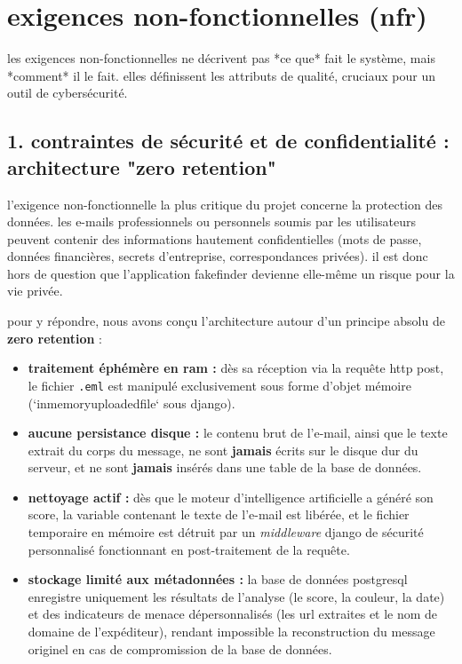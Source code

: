 \documentclass[12pt,a4paper]{report}
\begin{document}
\section{exigences non-fonctionnelles (nfr)}
les exigences non-fonctionnelles ne décrivent pas *ce que* fait le système, mais *comment* il le fait. elles définissent les attributs de qualité, cruciaux pour un outil de cybersécurité.

\subsection{1. contraintes de sécurité et de confidentialité : architecture "zero retention"}
l'exigence non-fonctionnelle la plus critique du projet concerne la protection des données. les e-mails professionnels ou personnels soumis par les utilisateurs peuvent contenir des informations hautement confidentielles (mots de passe, données financières, secrets d'entreprise, correspondances privées). 
il est donc hors de question que l'application fakefinder devienne elle-même un risque pour la vie privée. 

pour y répondre, nous avons conçu l'architecture autour d'un principe absolu de \textbf{zero retention} :
\begin{itemize}
    \item \textbf{traitement éphémère en ram :} dès sa réception via la requête http post, le fichier \texttt{.eml} est manipulé exclusivement sous forme d'objet mémoire (`inmemoryuploadedfile` sous django).
    \item \textbf{aucune persistance disque :} le contenu brut de l'e-mail, ainsi que le texte extrait du corps du message, ne sont \textbf{jamais} écrits sur le disque dur du serveur, et ne sont \textbf{jamais} insérés dans une table de la base de données.
    \item \textbf{nettoyage actif :} dès que le moteur d'intelligence artificielle a généré son score, la variable contenant le texte de l'e-mail est libérée, et le fichier temporaire en mémoire est détruit par un \textit{middleware} django de sécurité personnalisé fonctionnant en post-traitement de la requête.
    \item \textbf{stockage limité aux métadonnées :} la base de données postgresql enregistre uniquement les résultats de l'analyse (le score, la couleur, la date) et des indicateurs de menace dépersonnalisés (les url extraites et le nom de domaine de l'expéditeur), rendant impossible la reconstruction du message originel en cas de compromission de la base de données.
\end{itemize}
\end{document}
